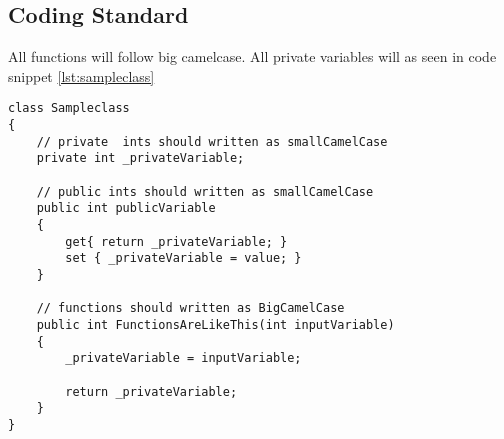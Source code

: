 \subsection{Coding Standard}
\label{subsec:coding_standard}

All functions will follow big camelcase. All private variables will  as seen in code snippet \ref{lst:sampleclass}

\begin{lstlisting}[style=sourceCode, caption=\myCaption{Sampleclass.cs}, label=lst:sampleclass]
class Sampleclass
{
    // private  ints should written as smallCamelCase
    private int _privateVariable;

    // public ints should written as smallCamelCase
    public int publicVariable
    {
        get{ return _privateVariable; }
        set { _privateVariable = value; }
    }

    // functions should written as BigCamelCase
    public int FunctionsAreLikeThis(int inputVariable)
    {
        _privateVariable = inputVariable;

        return _privateVariable;
    }
}
\end{lstlisting}